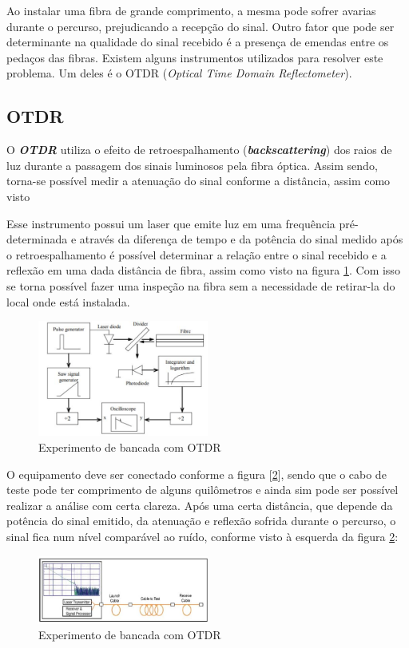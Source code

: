 \documentclass[article]{IEEEtran}
\begin{document}
Ao instalar uma fibra de grande comprimento, a mesma pode sofrer avarias durante o percurso, prejudicando a recepção do sinal. Outro fator que pode ser determinante na qualidade do sinal recebido é a presença de emendas entre os pedaços das fibras. Existem alguns instrumentos utilizados para resolver este problema. Um deles é o OTDR (\textit{Optical Time Domain Reflectometer}).


\subsection{OTDR}
O \textbf{\textit{OTDR}}  utiliza o efeito de retroespalhamento (\textbf{\textit{backscattering}}) dos raios de luz durante a passagem dos sinais luminosos pela fibra óptica. Assim sendo, torna-se possível medir a atenuação do sinal conforme a distância, assim como visto \cite{FOA}

Esse instrumento possui um laser que emite luz em uma frequência pré-determinada e através da diferença de tempo e da potência do sinal medido após o retroespalhamento é possível determinar a relação entre o sinal recebido e a reflexão em uma dada distância de fibra, assim como visto na figura \ref{fig:otdr_esquematico}. Com isso se torna possível fazer uma inspeção na fibra sem a necessidade de retirar-la do local onde está instalada.


\begin{figure}[H]
	\includegraphics[width=0.5\textwidth]{images/OTDR_esquematico.JPG}
	\caption{Experimento de bancada com OTDR}
	\label{fig:otdr_esquematico}
\end{figure}

O equipamento deve ser conectado conforme a figura [\ref{fig:otdr_teste}], sendo que o cabo de teste pode ter comprimento de alguns quilômetros e ainda sim  pode ser possível realizar a análise com certa clareza. Após uma certa distância, que depende da potência do sinal emitido, da atenuação e reflexão sofrida durante o percurso, o sinal fica num nível comparável ao ruído, conforme visto à esquerda da figura \ref{fig:otdr_teste}:
\begin{figure}[H]
	\includegraphics[width=0.5\textwidth]{images/OTDR_teste.JPG}
	\caption{Experimento de bancada com OTDR}
	\label{fig:otdr_teste}
\end{figure}
\end{document}
